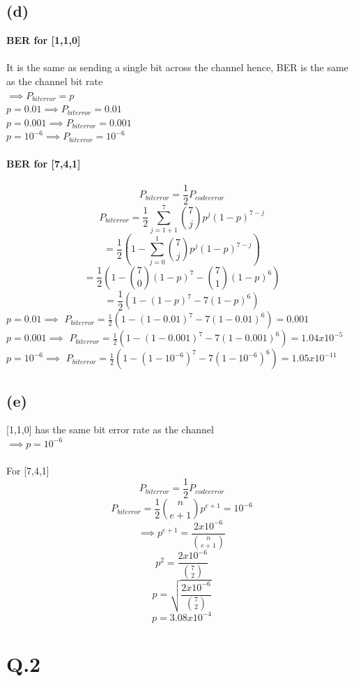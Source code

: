 \documentclass[a4paper,11pt]{article}
\begin{document}
\subsection*{(d)}
\textbf{BER for [1,1,0]}\\\\
It is the same as sending a single bit across the channel hence, BER is the same as the channel bit rate\\
$\implies P_{biterror}=p$\\
$ p = 0.01 \implies P_{biterror} = 0.01$\\
$ p = 0.001 \implies P_{biterror} = 0.001$\\
$ p = 10^{-6} \implies P_{biterror} = 10^{-6}$\\\\
\textbf{BER for [7,4,1]}\\\\
$$P_{biterror}  = \frac{1}{2}P_{codeerror}$$
$$ P_{biterror} = \frac{1}{2}\sum_{j=1+1}^{7} \binom{7}{j}p^j(1-p)^{7-j}$$
$$ = \frac{1}{2}(1-\sum_{j=0}^{1} \binom{7}{j}p^j(1-p)^{7-j})$$
$$ = \frac{1}{2}(1- \binom{7}{0}(1-p)^7 - \binom{7}{1}(1-p)^6)$$
$$ = \frac{1}{2}(1- (1-p)^7 - 7(1-p)^6)$$
$p = 0.01 \implies$ $P_{biterror} = \frac{1}{2}(1- (1-0.01)^7 - 7(1-0.01)^6) = 0.001$\\
$p = 0.001 \implies$ $P_{biterror} = \frac{1}{2}(1- (1-0.001)^7 - 7(1-0.001)^6) = 1.04x10^{-5}$\\
$p = 10^{-6} \implies$ $P_{biterror} = \frac{1}{2}(1- (1- 10^{-6})^7 - 7(1- 10^{-6})^6) =  1.05x10^{-11}$
\subsection*{(e)}
[1,1,0] has the same bit error rate as the channel\\
$\implies p = 10^{-6}$  \\\\
For [7,4,1]\\
$$P_{biterror} = \frac{1}{2}P_{codeerror}$$
$$P_{biterror} = \frac{1}{2}\binom{n}{e+1}p^{e+1} = 10^{-6}$$
$$\implies p^{e+1} = \frac{2x10^{-6}}{\binom{n}{e+1}}$$
$$ p^{2} = \frac{2x10^{-6}}{\binom{7}{2}}$$
$$p = \sqrt{\frac{2x10^{-6}}{\binom{7}{2}}}$$
$$p = 3.08x10^{-4}$$








\newpage
\clearpage
\section*{Q.2}
\end{document}
